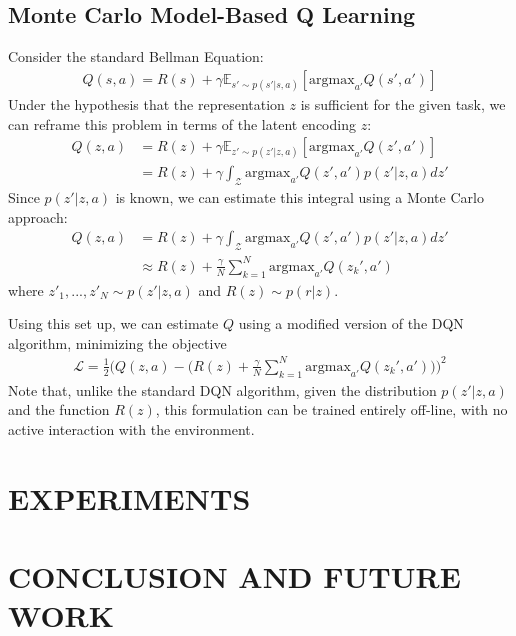 \documentclass[letterpaper, 10 pt, conference]{ieeeconf}  %
\begin{document}
\subsection{Monte Carlo Model-Based Q Learning}
Consider the standard Bellman Equation:
\begin{align*}
	Q(s,a) = R(s) + \gamma\mathbb{E}_{s'\sim p(s'|s,a)}[\text{argmax}_{a'}Q(s',a')]
\end{align*}
Under the hypothesis that the representation $z$ is sufficient for the given task, we can reframe this problem in terms of the latent encoding $z$:
\begin{align*}
	Q(z,a) &= R(z) + \gamma\mathbb{E}_{z'\sim p(z'|z,a)}[\text{argmax}_{a'}Q(z',a')]\\
	&= R(z) + \gamma\int_\mathcal{Z} \text{argmax}_{a'}Q(z',a')p(z'|z,a)dz'
\end{align*}
Since $p(z'|z,a)$ is known, we can estimate this integral using a Monte Carlo approach:
\begin{align*}
	Q(z,a) &= R(z) + \gamma\int_\mathcal{Z} \text{argmax}_{a'}Q(z',a')p(z'|z,a)dz'\\
	&\approx R(z) + \frac{\gamma}{N}\sum_{k=1}^N \text{argmax}_{a'}Q(z_k',a')
\end{align*}
where $z'_1,...,z'_N \sim p(z'|z,a)$ and $R(z) \sim p(r|z)$.

Using this set up, we can estimate $Q$ using a modified version of the DQN algorithm, minimizing the objective
\begin{align*}
	\mathcal{L} = \frac{1}{2}\Big(Q(z,a)-\big(R(z) + \frac{\gamma}{N}\sum_{k=1}^N \text{argmax}_{a'}Q(z_k',a')\big)\Big)^2 
\end{align*}
Note that, unlike the standard DQN algorithm, given the distribution $p(z'|z,a)$ and the function $R(z)$, this formulation can be trained entirely off-line, with no active interaction with the environment.

\section{EXPERIMENTS}

\section{CONCLUSION AND FUTURE WORK}
\end{document}
